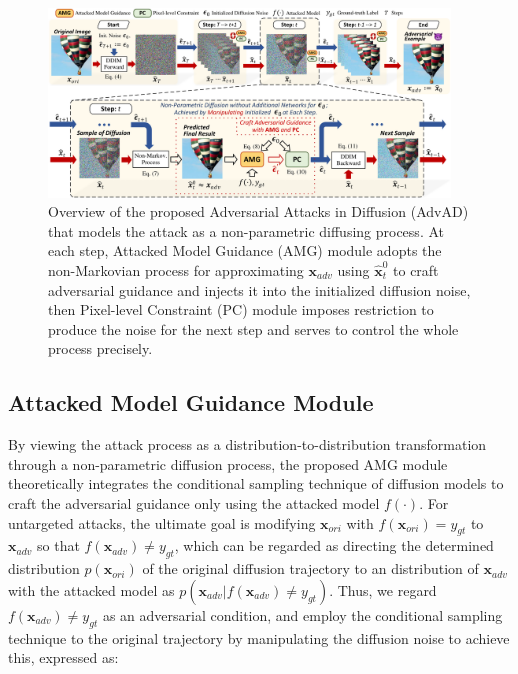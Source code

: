 \documentclass{article}
\begin{document}
\begin{figure}[t]
\centering
\includegraphics[width=0.95\textwidth]{figures/fig1-new.pdf}
\caption{
Overview of the proposed Adversarial Attacks in Diffusion (AdvAD) that models the attack {as a non-parametric diffusing process}. 
At each step, Attacked Model Guidance (AMG) module adopts the non-Markovian process for approximating $\boldsymbol{x}_{adv}$ using $\boldsymbol{\hat{x}}_{t}^0$ to craft adversarial guidance and injects it into the initialized diffusion noise, then Pixel-level Constraint (PC) module imposes restriction to produce the noise for the next step and serves to control the whole process precisely.
}
\label{fig:1}
\vspace{-0.5cm}
\end{figure}


\subsection{Attacked Model Guidance Module}
\label{sec:3.2}


By viewing the attack process as a distribution-to-distribution transformation through a non-parametric diffusion process, the proposed AMG module theoretically integrates the conditional sampling technique of diffusion models to craft the adversarial guidance only using the attacked model $f(\cdot)$. 
For untargeted attacks, the ultimate goal is modifying $\boldsymbol{x}_{ori}$ with $f(\boldsymbol{x}_{ori}) = y_{gt}$ to $\boldsymbol{x}_{adv}$ so that $f(\boldsymbol{x}_{adv}) \neq y_{gt}$, 
which can be regarded as directing the determined distribution $p(\boldsymbol{x}_{ori})$ of the original diffusion trajectory to an distribution of $\boldsymbol{x}_{adv}$ with the attacked model as $p(\boldsymbol{x}_{adv} | f(\boldsymbol{x}_{adv}) \neq y_{gt})$. {Thus, we regard $f(\boldsymbol{x}_{adv}) \neq y_{gt}$ as an adversarial condition, and employ the conditional sampling technique to the original trajectory by manipulating the diffusion noise to achieve this, expressed as:}   
\end{document}
